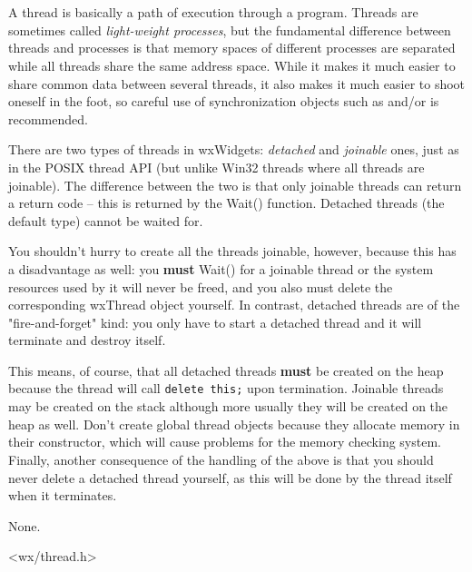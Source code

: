 \section{}\label{wxthread}

A thread is basically a path of execution through a program. Threads are
sometimes called {\it light-weight processes}, but the fundamental difference
between threads and processes is that memory spaces of different processes are
separated while all threads share the same address space. While it makes it
much easier to share common data between several threads, it also makes it much
easier to shoot oneself in the foot, so careful use of synchronization objects
such as  and/or  is recommended.

There are two types of threads in wxWidgets: {\it detached} and {\it joinable}
ones, just as in the POSIX thread API (but unlike Win32 threads where all threads
are joinable). The difference between the two is that only joinable threads
can return a return code -- this is returned by the Wait() function. Detached
threads (the default type) cannot be waited for.

You shouldn't hurry to create all the threads joinable, however, because this
has a disadvantage as well: you {\bf must} Wait() for a joinable thread or the
system resources used by it will never be freed, and you also must delete the
corresponding wxThread object yourself. In contrast, detached threads are of the
"fire-and-forget" kind: you only have to start a detached thread and it will
terminate and destroy itself.

This means, of course, that all detached threads {\bf must} be created on the
heap because the thread will call {\tt delete this;} upon termination. Joinable
threads may be created on the stack although more usually they will be created
on the heap as well. Don't create global thread objects because they allocate
memory in their constructor, which will cause problems for the memory checking
system. Finally, another consequence of the handling of the above is that you
should never delete a detached thread yourself, as this will be done by the
thread itself when it terminates.


None.


<wx/thread.h>



